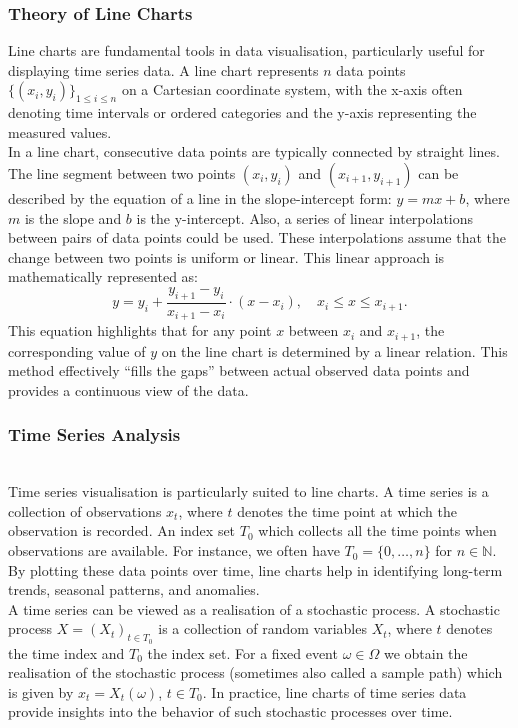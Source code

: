 \documentclass{article}\usepackage[]{graphicx}\usepackage[]{xcolor}
\numberwithin{equation}{section}
\begin{document}
\subsubsection{Theory of Line Charts}

\noindent
Line charts are fundamental tools in data visualisation, particularly useful for displaying time series data. A line chart represents $n$ data points 
$\{(x_i,y_i)\}_{1 \leq i \leq n}$ on a Cartesian coordinate system, with the x-axis often denoting time intervals or ordered categories and the y-axis representing the measured values.\\ 

\noindent
In a line chart, consecutive data points are typically connected by straight lines. The line segment between two points \((x_i,y_i)\) and \((x_{i+1},y_{i+1})\) can be described by the equation of a line in the slope-intercept form: \(y=mx+b\), where \(m\) is the slope and \(b\) is the y-intercept. Also, a series of linear interpolations between pairs of data points could be used. These interpolations assume that the change between two points is uniform or linear. This linear approach is mathematically represented as:
\[
y = y_i + \frac{y_{i+1} - y_i}{x_{i+1} - x_i} \cdot (x - x_i), \quad  x_i \leq x \leq x_{i+1}.
\]
\noindent
This equation highlights that for any point \(x\) between \(x_i\) and \(x_{i+1}\), the corresponding value of \(y\) on the line chart is determined by a linear relation. This method effectively ``fills the gaps'' between actual observed data points and provides a continuous view of the data.

\subsubsection{Time Series Analysis}\\
\noindent
Time series visualisation is particularly suited to line charts. A time series is a collection of observations $x_t$, where $t$ denotes the time point at which the observation is recorded. An index set $T_0$ which collects all the time points when observations are available. For instance, we often have $T_0 = \{0,\dots ,n\}$ for $n \in \mathbb{N}$. By plotting these data points over time, line charts help in identifying long-term trends, seasonal patterns, and anomalies.\\

\noindent
A time series can be viewed as a realisation of a stochastic process. A stochastic process \cite{Brockwell2016Introduction} $X = (X_t)_{t \in T_0}$ is a collection of random variables $X_t$, where $t$ denotes the time index and $T_0$ the index set. For a fixed event $\omega \in \Omega$ we obtain the realisation of the stochastic process (sometimes also called a sample path) which is given by $x_t = X_t(\omega)$, $t \in T_0$. In practice, line charts of time series data provide insights into the behavior of such stochastic processes over time.\\
\end{document}
